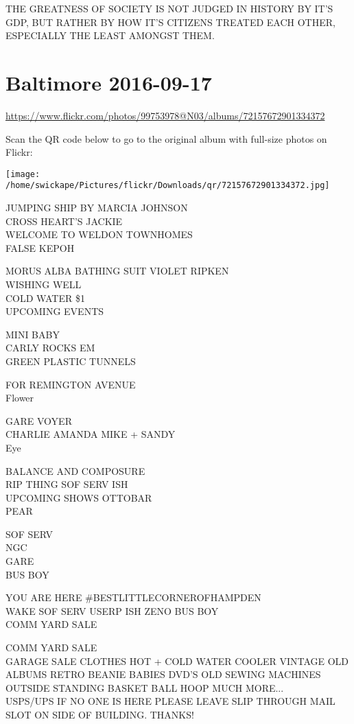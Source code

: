 \documentclass[10pt,letterpaper]{article}
\begin{document}
THE GREATNESS OF SOCIETY IS NOT JUDGED IN HISTORY BY IT'S GDP, BUT RATHER BY HOW IT'S CITIZENS TREATED EACH OTHER, ESPECIALLY THE LEAST AMONGST THEM.
\pagebreak

\section*{Baltimore 2016-09-17}

\url{https://www.flickr.com/photos/99753978@N03/albums/72157672901334372}

Scan the QR code below to go to the original album with full-size photos on Flickr:

\texttt{[image: /home/swickape/Pictures/flickr/Downloads/qr/72157672901334372.jpg]}
\pagebreak

JUMPING SHIP BY MARCIA JOHNSON\\
CROSS HEART'S JACKIE\\
WELCOME TO WELDON TOWNHOMES\\
FALSE KEPOH

MORUS ALBA BATHING SUIT VIOLET RIPKEN\\
WISHING WELL\\
COLD WATER \$1\\
UPCOMING EVENTS

MINI BABY\\
CARLY ROCKS EM\\
GREEN PLASTIC TUNNELS

FOR REMINGTON AVENUE\\
Flower

GARE VOYER\\
CHARLIE AMANDA MIKE + SANDY\\
Eye

BALANCE AND COMPOSURE\\
RIP THING SOF SERV ISH\\
UPCOMING SHOWS OTTOBAR\\
PEAR

SOF SERV\\
NGC\\
GARE\\
BUS BOY

YOU ARE HERE \#BESTLITTLECORNEROFHAMPDEN\\
WAKE SOF SERV USERP ISH ZENO BUS  BOY\\
COMM YARD SALE

COMM YARD SALE\\
GARAGE SALE CLOTHES HOT + COLD WATER COOLER VINTAGE OLD ALBUMS RETRO BEANIE BABIES DVD'S OLD SEWING MACHINES OUTSIDE STANDING BASKET BALL HOOP MUCH MORE...\\
USPS/UPS IF NO ONE IS HERE PLEASE LEAVE SLIP THROUGH MAIL SLOT ON SIDE OF BUILDING.  THANKS!
\end{document}
